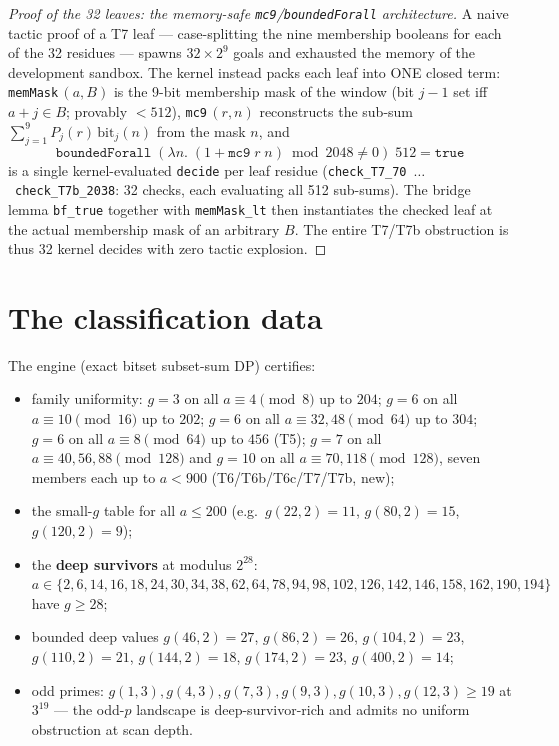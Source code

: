 \documentclass[11pt]{article}
\begin{document}
\begin{proof}[Proof of the 32 leaves: the memory-safe \texttt{mc9}/\texttt{boundedForall} architecture]
A naive tactic proof of a T7 leaf --- case-splitting the nine membership
booleans for each of the 32 residues --- spawns $32 \times 2^9$ goals and
exhausted the memory of the development sandbox. The kernel instead packs
each leaf into ONE closed term: \texttt{memMask}\,$(a, B)$ is the 9-bit
membership mask of the window (bit $j-1$ set iff $a+j \in B$; provably
$< 512$), \texttt{mc9}\,$(r, n)$ reconstructs the sub-sum
$\sum_{j=1}^{9} P_j(r)\,\mathrm{bit}_j(n)$ from the mask $n$, and
\[
\texttt{boundedForall}\;(\lambda n.\; (1 + \texttt{mc9}\; r\; n) \bmod 2048 \ne 0)\;512 = \texttt{true}
\]
is a single kernel-evaluated \texttt{decide} per leaf residue
(\texttt{check\_T7\_70}~$\dots$~\texttt{check\_T7b\_2038}: 32 checks, each
evaluating all 512 sub-sums). The bridge lemma \texttt{bf\_true} together
with \texttt{memMask\_lt} then instantiates the checked leaf at the actual
membership mask of an arbitrary $B$. The entire T7/T7b obstruction is thus
32 kernel decides with zero tactic explosion.
\end{proof}

\section*{The classification data}

The engine (exact bitset subset-sum DP) certifies:
\begin{itemize}
\item family uniformity: $g = 3$ on all $a \equiv 4 \pmod 8$ up to $204$;
$g = 6$ on all $a \equiv 10 \pmod{16}$ up to $202$; $g = 6$ on all
$a \equiv 32, 48 \pmod{64}$ up to $304$; $g = 6$ on all $a \equiv 8
\pmod{64}$ up to $456$ (T5); $g = 7$ on all $a \equiv 40, 56, 88
\pmod{128}$ and $g = 10$ on all $a \equiv 70, 118 \pmod{128}$, seven
members each up to $a < 900$ (T6/T6b/T6c/T7/T7b, new);
\item the small-$g$ table for all $a \le 200$ (e.g.\ $g(22,2) = 11$,
$g(80,2) = 15$, $g(120,2) = 9$);
\item the \textbf{deep survivors} at modulus $2^{28}$:
$a \in \{2, 6, 14, 16, 18, 24, 30, 34, 38, 62, 64, 78, 94, 98, 102, 126,
142, 146, 158, 162, 190,  194\}$ have $g \ge 28$;
\item bounded deep values $g(46,2) = 27$, $g(86,2) = 26$, $g(104,2) = 23$,
$g(110,2) = 21$, $g(144,2) = 18$, $g(174,2) = 23$, $g(400,2) = 14$;
\item odd primes: $g(1,3), g(4,3), g(7,3), g(9,3), g(10,3), g(12,3)
\ge 19$ at $3^{19}$ --- the odd-$p$ landscape is deep-survivor-rich and
admits no uniform obstruction at scan depth.
\end{itemize}
\end{document}
